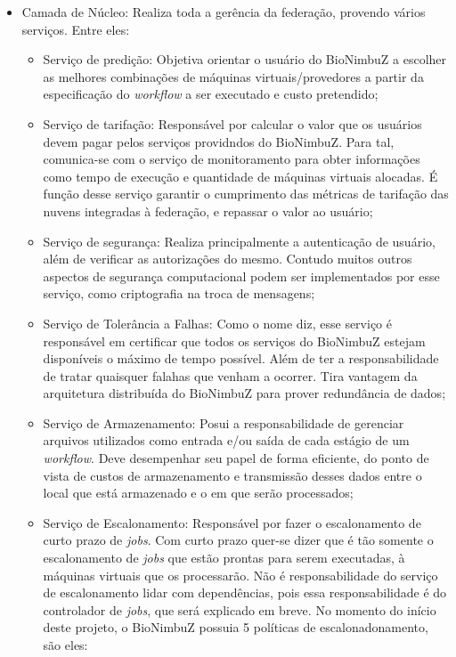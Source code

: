 \begin{itemize}
	\item Camada de Núcleo: Realiza toda a gerência da federação, provendo vários serviços. Entre eles:
	\begin{itemize}
		\item Serviço de predição: Objetiva orientar o usuário do BioNimbuZ a escolher as melhores combinações de máquinas virtuais/provedores a partir da especificação do \textit{workflow} a ser executado e custo pretendido;
		\item Serviço de tarifação: Responsável por calcular o valor que os usuários devem pagar pelos serviços providndos do BioNimbuZ. Para tal, comunica-se com o serviço de monitoramento para obter informações como tempo de execução e quantidade de máquinas virtuais alocadas. É função desse serviço garantir o cumprimento das métricas de tarifação das nuvens integradas à federação, e repassar o valor ao usuário;
		\item Serviço de segurança: Realiza principalmente a autenticação de usuário, além de verificar as autorizações do mesmo. Contudo muitos outros aspectos de segurança computacional podem ser implementados por esse serviço, como criptografia na troca de mensagens;
		\item Serviço de Tolerância a Falhas: Como o nome diz, esse serviço é responsável em certificar que todos os serviços do BioNimbuZ estejam disponíveis o máximo de tempo possível. Além de ter a responsabilidade de tratar quaisquer falahas que venham a ocorrer. Tira vantagem da arquitetura distribuída do BioNimbuZ para prover redundância de dados;
		\item Serviço de Armazenamento: Posui a responsabilidade de gerenciar arquivos utilizados como entrada e/ou saída de cada estágio de um \textit{workflow}. Deve desempenhar seu papel de forma eficiente, do ponto de vista de custos de armazenamento e transmissão desses dados entre o local que está armazenado e o em que serão processados;
		\item Serviço de Escalonamento: Responsável por fazer o escalonamento de curto prazo de \textit{jobs}. Com curto prazo quer-se dizer que é tão somente o escalonamento de \textit{jobs} que estão prontas para serem executadas, à máquinas virtuais que os processarão. Não é responsabilidade do serviço de escalonamento lidar com dependências, pois essa responsabilidade é do controlador de \textit{jobs}, que será explicado em breve.
		No momento do início deste projeto, o BioNimbuZ possuia 5 políticas de escalonadonamento, são eles:
		\begin{itemize}

\end{itemize}
\end{itemize}
\end{itemize}
